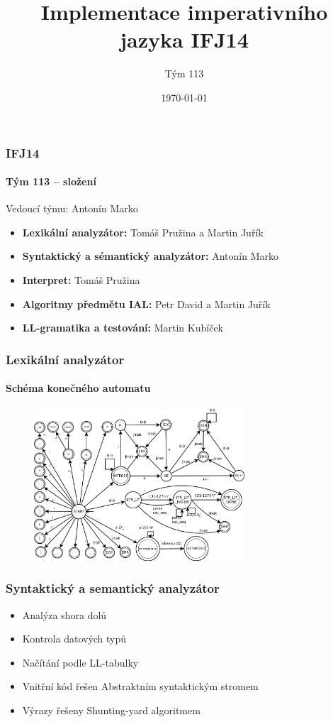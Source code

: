 \documentclass[12pt]{beamer}
\title{Implementace imperativního jazyka IFJ14}
\author{Tým 113}
\institute{Fakulta informačních technologií \\Vysokého učení technického v~Brně}
\date{\today}
\begin{document}
\begin{frame}
	\titlepage
\end{frame}

\begin{frame}
	\frametitle{IFJ14}
	\framesubtitle{Tým 113 -- složení}
	Vedoucí týmu: Antonín Marko
	\begin{itemize}
		\item \textbf{Lexikální analyzátor:} Tomáš Pružina a Martin Juřík
		\item \textbf{Syntaktický a sémantický analyzátor:} Antonín Marko
		\item \textbf{Interpret:} Tomáš Pružina
		\item \textbf{Algoritmy předmětu IAL:} Petr David a Martin Juřík
		\item \textbf{LL-gramatika a testování:} Martin Kubíček
	\end{itemize}
\end{frame}

\begin{frame}
	\frametitle{Lexikální analyzátor}
	\framesubtitle{Schéma konečného automatu}
	\begin{figure}
		\centering
			\includegraphics[width=0.7\textwidth]{KA-scanner.png}
	\end{figure}
\end{frame}

\begin{frame}
	\frametitle{Syntaktický a semantický analyzátor}
	\begin{itemize}
		\item Analýza shora dolů
		\item Kontrola datových typů
		\item Načítání podle LL-tabulky
		\item Vnitřní kód řešen Abstraktním syntaktickým stromem
		\item Výrazy řešeny Shunting-yard algoritmem
	\end{itemize}
\end{frame}
\end{document}
